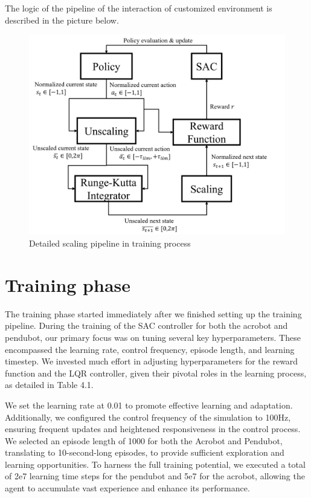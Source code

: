 The logic of the pipeline of the interaction of customized environment is described in the picture below.

\begin{figure}[H]
    \centering
    \includegraphics[width=0.85\linewidth]{figures/simulation_result/scaling_mechanism.png}
    \caption{Detailed scaling pipeline in training process}
    \label{fig:my_label}
\end{figure}

\section{Training phase}
The training phase started immediately after we finished setting up the training pipeline. During the training of the SAC controller for both the acrobot and pendubot, our primary focus was on tuning several key hyperparameters. These encompassed the learning rate, control frequency, episode length, and learning timestep. We invested much effort in adjusting hyperparameters for the reward function and the LQR controller, given their pivotal roles in the learning process, as detailed in Table 4.1.

We set the learning rate at 0.01 to promote effective learning and adaptation. Additionally, we configured the control frequency of the simulation to 100Hz, ensuring frequent updates and heightened responsiveness in the control process. We selected an episode length of 1000 for both the Acrobot and Pendubot, translating to 10-second-long episodes, to provide sufficient exploration and learning opportunities. To harness the full training potential, we executed a total of 2e7 learning time steps for the pendubot and 5e7 for the acrobot, allowing the agent to accumulate vast experience and enhance its performance.

